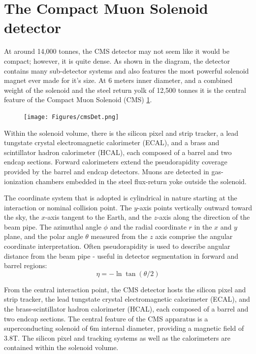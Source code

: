 \section{The Compact Muon Solenoid detector}
At around 14,000 tonnes, the CMS detector may not seem like it would be compact; however, it is quite dense. As shown in the diagram, the detector contains many sub-detector systems and also features the most powerful solenoid magnet ever made for it's size. At 6 meters inner diameter, and a combined weight of the solenoid and the steel return yolk of 12,500 tonnes it is the central feature of the Compact Muon Solenoid (CMS) \ref{fig:cmsdet}.
\begin{figure}[!htb]
\begin{center}
\texttt{[image: Figures/cmsDet.png]}
\label{fig:cmsdet}
\end{center}
\end{figure}
 Within the solenoid volume, there is the
silicon pixel and strip tracker, a lead tungstate crystal 
electromagnetic calorimeter (ECAL), and a brass and scintillator 
hadron calorimeter (HCAL), each composed of a barrel and two endcap 
sections. Forward calorimeters extend the pseudorapidity 
coverage provided by the barrel and endcap detectors. 
Muons are detected in gas-ionization chambers embedded 
in the steel flux-return yoke outside the solenoid.

The coordinate system that is adopted is cylindrical in nature starting at the interaction or nominal collision point. The $y$-axis points vertically outward toward the sky, the $x$-axis tangent to the Earth, and the $z$-axis along the direction of the beam pipe. The azimuthal angle $\phi$ and the radial coordinate $r$ in the $x$ and $y$ plane, and the polar angle $\theta$ measured from the $z$ axis comprise the angular coordinate interpretation. Often pseudorapidity is used to describe angular distance from the beam pipe - useful in detector segmentation in forward and barrel regions:
\[\eta = - \ln \tan(\theta/2)\]  


From the central interaction point, the CMS detector hosts
the silicon pixel and strip tracker, the lead tungstate crystal electromagnetic
calorimeter (ECAL), and the brass-scintillator hadron calorimeter (HCAL),
each composed of a barrel and two endcap sections. The central feature of
the CMS apparatus is a superconducting solenoid of 6\unit{m} internal diameter, providing
a magnetic field of 3.8\unit{T}. The silicon pixel and tracking systems as well as
the calorimeters are contained within the solenoid volume.  %


